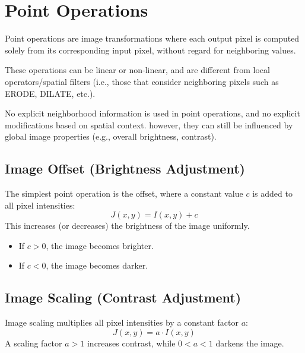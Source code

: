 
\section{Point Operations}

Point operations are image transformations where each output pixel is computed solely from its corresponding input pixel, without regard for neighboring values.


These operations can be linear or non-linear, and are different from local operators/spatial filters (i.e., those that consider neighboring pixels such as ERODE, DILATE, etc.).

No explicit neighborhood information is used in point operations, and no explicit modifications based on spatial context. however, they can still be influenced by global image properties (e.g., overall brightness, contrast).



\subsection{Image Offset (Brightness Adjustment)}
The simplest point operation is the offset, where a constant value $c$ is added to all pixel intensities:
$$
J(x, y) = I(x, y) + c
$$
This increases (or decreases) the brightness of the image uniformly.
\begin{itemize}
    \item If $c > 0$, the image becomes brighter.
    \item If $c < 0$, the image becomes darker.
\end{itemize}


\subsection{Image Scaling (Contrast Adjustment)}
Image scaling multiplies all pixel intensities by a constant factor $a$:
$$
J(x, y) = a \cdot I(x, y)
$$
A scaling factor $a > 1$ increases contrast, while $0 < a < 1$ darkens the image.



